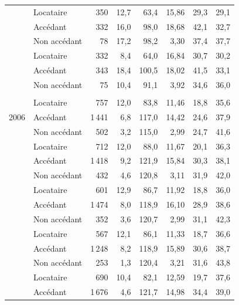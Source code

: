 \documentclass[12pt,a4paper]{article}
\begin{document}
\begin{table}[htbp]
\begin{threeparttable}
\begin{tabular}{llrrrrrr}
				\addlinespace
				\multirow{3}{*}{2024} & Locataire      & 350 & 12,7 & 63,4 & 15,86 & 29,3 & 29,1 \\
				 & Accédant           & 332 & 16,0 & 98,0 & 18,68 & 42,1 & 32,7 \\
				 & Non accédant       & 78  & 17,2 & 98,2 & 3,30  & 37,4 & 37,7 \\
				\addlinespace
				\multirow{3}{*}{2025} & Locataire      & 332 & 8,4  & 64,0 & 16,84 & 30,7 & 30,2 \\
				 & Accédant           & 343 & 18,4 & 100,5 & 18,02 & 41,5 & 33,1 \\
				 & Non accédant       & 75  & 10,4 & 91,1 & 3,92  & 34,6 & 36,0 \\
				\addlinespace
				\midrule
				\multicolumn{8}{l}{\textit{Rang 2 et plus}} \\
				\multirow{3}{*}{2006} & Locataire      & 757  & 12,0 & 83,8  & 11,46 & 18,8 & 35,6 \\
				 & Accédant           & 1\,441 & 6,8  & 117,0 & 14,42 & 24,6 & 37,9 \\
				 & Non accédant       & 502  & 3,2  & 115,0 & 2,99  & 24,7 & 41,6 \\
				\addlinespace
				\multirow{3}{*}{2010} & Locataire      & 712  & 12,0 & 88,0  & 11,67 & 20,1 & 36,3 \\
				 & Accédant           & 1\,418 & 9,2  & 121,9 & 15,84 & 30,3 & 38,1 \\
				 & Non accédant       & 432  & 4,6  & 120,8 & 3,11  & 31,9 & 42,0 \\
				\addlinespace
				\multirow{3}{*}{2014} & Locataire      & 601  & 12,9 & 86,7  & 11,92 & 18,8 & 36,0 \\
				 & Accédant           & 1\,474 & 8,0  & 118,9 & 16,10 & 28,9 & 38,6 \\
				 & Non accédant       & 352  & 3,6  & 120,7 & 2,99  & 31,1 & 42,3 \\
				\addlinespace
				\multirow{3}{*}{2018} & Locataire      & 567  & 12,1 & 86,1  & 11,33 & 18,7 & 36,6 \\
				 & Accédant           & 1\,248 & 8,2  & 118,9 & 15,89 & 30,6 & 38,7 \\
				 & Non accédant       & 253  & 1,3  & 120,4 & 3,21  & 31,6 & 43,8 \\
				\addlinespace
				\multirow{3}{*}{2024} & Locataire      & 690  & 10,4 & 82,1  & 12,59 & 19,7 & 37,6 \\
				 & Accédant           & 1\,676 & 4,6  & 121,7 & 14,98 & 34,4 & 39,0 \\

\end{tabular}
\end{threeparttable}
\end{table}
\end{document}
